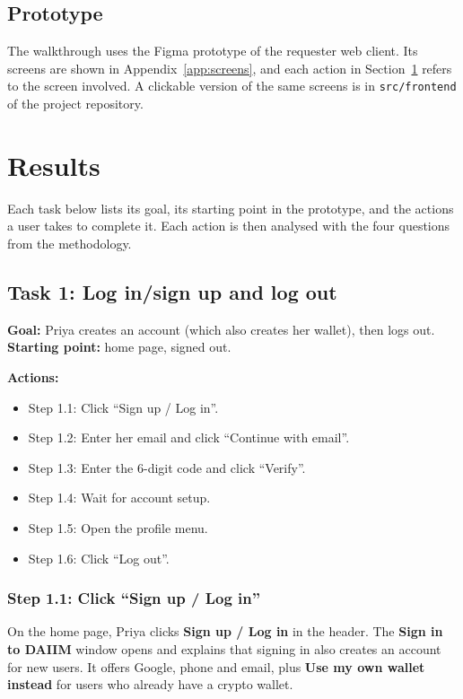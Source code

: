 \documentclass{article}
\begin{document}
\subsection{Prototype}
The walkthrough uses the Figma prototype of the requester web client. Its screens are shown in Appendix~\ref{app:screens}, and each action in Section~\ref{sec:results} refers to the screen involved. A clickable version of the same screens is in \texttt{src/frontend} of the project repository.


\section{Results}
\label{sec:results}
Each task below lists its goal, its starting point in the prototype, and the actions a user takes to complete it.
Each action is then analysed with the four questions from the methodology.

\subsection{Task 1: Log in/sign up and log out}
\textbf{Goal:} Priya creates an account (which also creates her wallet), then logs out.\\
\textbf{Starting point:} home page, signed out.

\textbf{Actions:}
\begin{itemize}
    \item Step 1.1: Click ``Sign up / Log in''.
    \item Step 1.2: Enter her email and click ``Continue with email''.
    \item Step 1.3: Enter the 6-digit code and click ``Verify''.
    \item Step 1.4: Wait for account setup.
    \item Step 1.5: Open the profile menu.
    \item Step 1.6: Click ``Log out''.
\end{itemize}

\subsubsection{Step 1.1: Click ``Sign up / Log in''}
On the home page, Priya clicks \textbf{Sign up / Log in} in the header. The \textbf{Sign in to DAIIM} window opens and explains that signing in also creates an account for new users. It offers Google, phone and email, plus \textbf{Use my own wallet instead} for users who already have a crypto wallet.
\end{document}
